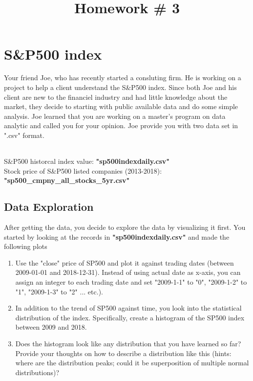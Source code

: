 \documentclass{article}
\title{Homework \#	3} %
\begin{document}
\maketitle %
\thispagestyle{fancy}
\pagestyle{fancy}



\section{S\&P500 index} %
Your friend Joe, who has recently started a consluting firm. He is working on a project to help a client understand the S\&P500 index. Since both Joe and his client are new to the financiel industry and had little knowledge about the market, they decide to starting with public available data and do some simple analysis. Joe learned that you are working on a master's program on data analytic and called you for your opinion. Joe provide you with two data set in ".csv" format.


\begin{warn}[Data:] %
\\
S\&P500 historcal index value: \textbf{"sp500indexdaily.csv"}\\
Stock price of S\&P500 listed companies (2013-2018):  \textbf{"sp500\_cmpny\_all\_stocks\_5yr.csv"}
\end{warn}


\subsection{Data Exploration} %

After getting the data, you decide to explore the data by visualizing it first. You started by looking at the records in \textbf{"sp500indexdaily.csv"} and made the following plots

\begin{enumerate}[(1)]
	\item Use the "close" price of SP500 and plot it against trading dates (between 2009-01-01 and 2018-12-31). Instead of using actual date as x-axis, you can assign an integer to each trading date and set "2009-1-1" to "0", "2009-1-2" to "1",  "2009-1-3" to "2" ... etc.).
	\item In addition to the trend of SP500 against time, you look into the statistical distribution of the index. Specifically, create a histogram of the SP500 index between 2009 and 2018.
	\item Does the histogram look like any distribution that you have learned so far? Provide your thoughts on how to describe a distribution like this (hints: where are the distribution peaks; could it be superposition of multiple normal distributions)? 
\end{enumerate}
\end{document}
